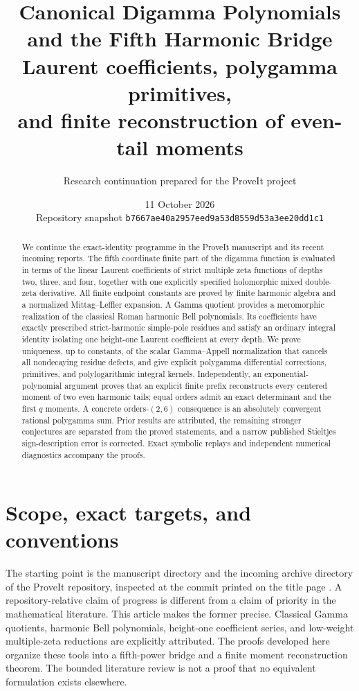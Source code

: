 \documentclass[11pt,a4paper]{article}
\title{\textbf{Canonical Digamma Polynomials\protect\\and the Fifth Harmonic Bridge}\\[5pt]
\large Laurent coefficients, polygamma primitives,\\and finite reconstruction of even-tail moments}
\author{Research continuation prepared for the ProveIt project}
\date{11 October 2026\\\small Repository snapshot \texttt{b7667ae40a2957eed9a53d8559d53a3ee20dd1c1}}
\numberwithin{equation}{section}
\theoremstyle{definition}
\begin{document}
\maketitle
\begin{abstract}
We continue the exact-identity programme in the ProveIt manuscript and
its recent incoming reports. The fifth coordinate finite part of the
digamma function is evaluated in terms of the linear Laurent
coefficients of strict multiple zeta functions of depths two, three,
and four, together with one explicitly specified holomorphic mixed
double-zeta derivative. All finite endpoint constants are proved by
finite harmonic algebra and a normalized Mittag--Leffler expansion.
A Gamma quotient provides a meromorphic realization of the classical
Roman harmonic Bell polynomials. Its coefficients have exactly
prescribed strict-harmonic simple-pole residues and satisfy an ordinary
integral identity isolating one height-one Laurent coefficient at every
depth. We prove uniqueness, up to constants, of the scalar Gamma--Appell
normalization that cancels all nondecaying residue defects, and give
explicit polygamma differential corrections, primitives, and polylogarithmic
integral kernels. Independently, an exponential-polynomial argument proves
that an explicit finite prefix reconstructs every centered moment of
two even harmonic tails; equal orders admit an exact determinant and
the first $q$ moments. A concrete orders-$(2,6)$ consequence is an
absolutely convergent rational polygamma sum. Prior results are attributed,
the remaining stronger conjectures are separated from the proved
statements, and a narrow published Stieltjes sign-description error is
corrected. Exact symbolic replays and independent numerical diagnostics
accompany the proofs.
\end{abstract}
\tableofcontents
\clearpage
\section{Scope, exact targets, and conventions}
\label{sec:scope}

The starting point is the manuscript directory and the incoming archive
directory of the ProveIt repository, inspected at the commit printed on
the title page \cite{Repo}. A repository-relative claim of progress is
different from a claim of priority in the mathematical literature.
This article makes the former precise. Classical Gamma quotients,
harmonic Bell polynomials, height-one coefficient series, and
low-weight multiple-zeta reductions are explicitly attributed. The
proofs developed here organize these tools into a fifth-power bridge
and a finite moment reconstruction theorem. The bounded literature
review is not a proof that no equivalent formulation exists elsewhere.
\end{document}
